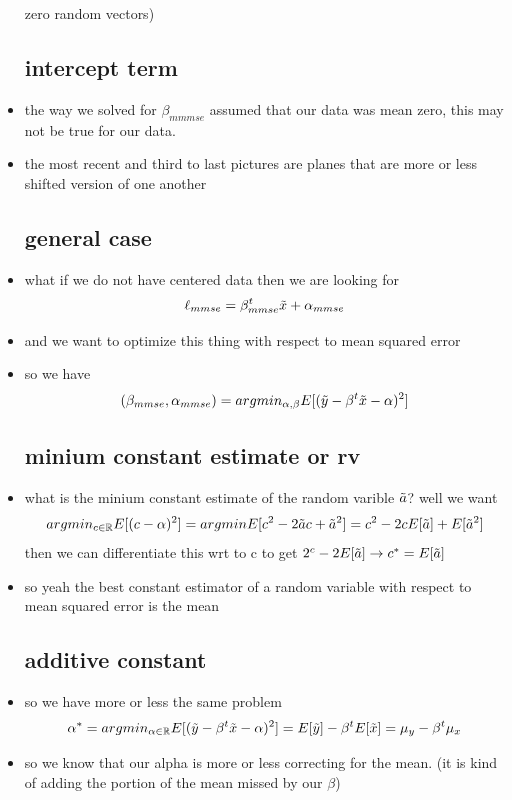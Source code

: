 \documentclass{article}
\begin{document}
\begin{itemize}
zero random vectors)
\subsection*{intercept term}
\item the way we solved for $\beta_{mmmse}$ assumed that our data was mean zero, this may not be true for our data. 
\item the most recent and third to last pictures are planes that are more or less shifted version of one another 
\subsection*{general case}
\item what if we do not have centered data then we are looking for $$\ell_{mmse}=\beta^t_{mmse}\Tilde{x}+\alpha_{mmse}$$
\item and we want to optimize this thing with respect to mean squared error 
\item so we have $$(\beta_{mmse}, \alpha_{mmse})=argmin_{\alpha,\beta}E[(\Tilde{y}-\beta^t\Tilde{x}-\alpha
)^2]$$
\subsection*{minium constant estimate or rv }
\item what is the minium constant estimate of the random varible $\Tilde{a}$? well we want $$argmin_{c\in \mathbb{R}}E[(c-\alpha)^2]=
argmin E[c^2-2\Tilde{a} c + \Tilde{a}^2]=c^2-2cE[\Tilde{a}]+E[\tilde{a}^2]$$
then we can differentiate this wrt to c to get $2^c-2E[\Tilde{a}]\rightarrow c^*=E[\Tilde{a}]$
\item so yeah the best constant estimator of a random variable with respect to mean squared error is the mean
\subsection*{additive constant}
\item so we have more or less the same problem $$\alpha^{*}=argmin_{\alpha \in \mathbb{R}}E[(\Tilde{y}-\beta^t\Tilde{x}-\alpha)^2]=E[\Tilde{y}]-\beta^tE[\Tilde{x}]=\mu_{y}-\beta^t\mu_{x}$$
\item so we know that our alpha is more or less correcting for the mean. (it is kind of adding the portion of the mean missed by our $\beta$)

\end{itemize}
\end{document}
